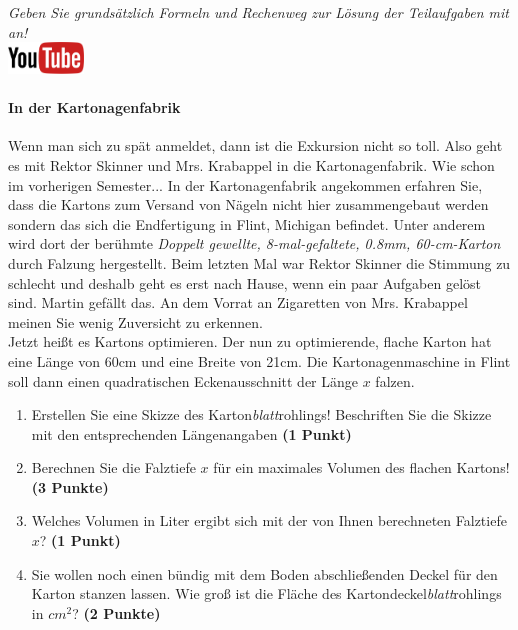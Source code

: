 \documentclass[a4paper, 9pt]{scrartcl}\usepackage[]{graphicx}\usepackage[]{xcolor}
\begin{document}
\textit{Geben Sie grunds{\"a}tzlich Formeln und Rechenweg zur L{\"o}sung der
  Teilaufgaben mit an!} \\[1Ex]

\hfill\href{https://youtu.be/RuzMjwvwT-4}{\includegraphics[width =
  2cm]{img/youtube}} %
\hspace{2Ex}

\paragraph{In der Kartonagenfabrik}



Wenn man sich zu sp{\"a}t anmeldet, dann ist die Exkursion nicht so toll. Also
geht es mit Rektor Skinner und Mrs. Krabappel in die Kartonagenfabrik. Wie
schon im vorherigen Semester... In der Kartonagenfabrik angekommen erfahren
Sie, dass die Kartons zum Versand von N{\"a}geln nicht hier zusammengebaut
werden sondern das sich die Endfertigung in Flint, Michigan befindet. Unter
anderem wird dort der ber{\"u}hmte \textit{Doppelt gewellte,
  8-mal-gefaltete, 0.8mm, 60-cm-Karton} durch
Falzung hergestellt. Beim letzten Mal war Rektor Skinner die Stimmung zu
schlecht und deshalb geht es erst nach Hause, wenn ein paar Aufgaben gel{\"o}st
sind. Martin gef{\"a}llt das. An dem Vorrat
an Zigaretten von Mrs. Krabappel meinen Sie wenig Zuversicht zu erkennen.\\

Jetzt hei{\ss}t es Kartons optimieren. Der nun zu optimierende, flache Karton
hat eine L{\"a}nge von 60cm und eine Breite von 21cm. Die
Kartonagenmaschine in Flint soll dann einen quadratischen Eckenausschnitt
der L{\"a}nge $x$ falzen.

\begin{enumerate}
\item Erstellen Sie eine Skizze des Karton\textit{blatt}rohlings!
  Beschriften Sie die Skizze mit den entsprechenden L{\"a}ngenangaben
  \textbf{(1 Punkt)}
\item Berechnen Sie die Falztiefe $x$ f{\"u}r ein maximales Volumen des flachen
  Kartons! \textbf{(3 Punkte)}
\item Welches Volumen in Liter ergibt sich mit der von Ihnen berechneten
  Falztiefe $x$?  \textbf{(1 Punkt)}
\item Sie wollen noch einen b{\"u}ndig mit dem Boden abschlie{\ss}enden Deckel f{\"u}r
  den Karton stanzen lassen. Wie gro{\ss} ist die Fl{\"a}che des
  Kartondeckel\textit{blatt}rohlings in $cm^2$? \textbf{(2 Punkte)}
\end{enumerate}
\end{document}
